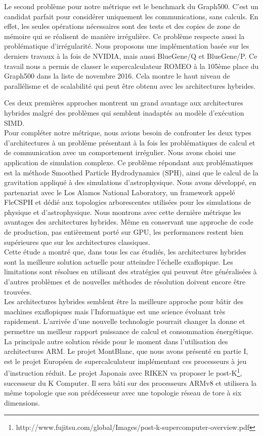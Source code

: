 \documentclass[12pt,a4paper]{report}
\begin{document}
Le second problème pour notre métrique est le benchmark du Graph500. 
C'est un candidat parfait pour considérer uniquement les communications, sans calculs. 
En effet, les seules opérations nécessaires sont des tests et des copies de zone de mémoire qui se réalisent de manière irrégulière. 
Ce problème respecte aussi la problématique d'irrégularité. 
Nous proposons une implémentation basée sur les derniers travaux à la fois de NVIDIA, mais aussi BlueGene/Q et BlueGene/P. 
Ce travail nous a permis de classer le supercalculateur ROMEO à la 105ème place du Graph500 dans la liste de novembre 2016. 
Cela montre le haut niveau de parallélisme et de scalabilité qui peut être obtenu avec les architectures hybrides.

Ces deux premières approches montrent un grand avantage aux architectures hybrides malgré des problèmes qui semblent inadaptés au modèle d'exécution SIMD. \\

Pour compléter notre métrique, nous avions besoin de confronter les deux types d'architectures à un problème présentant à la fois les problématiques de calcul et de communication avec un comportement irrégulier. 
Nous avons choisi une application de simulation complexe.
Ce problème répondant aux problématiques est la méthode Smoothed Particle Hydrodynamics (SPH), ainsi que le calcul de la gravitation appliqué à des simulations d'astrophysique.  
Nous avons développé, en partenariat avec le Los Alamos National Laboratory, un framework appelé FleCSPH et dédié aux topologies arborescentes utilisées pour les simulations de physique et d'astrophysique. 
Nous montrons avec cette dernière métrique les avantages des architectures hybrides. 
Même en conservant une approche de code de production, pas entièrement porté sur GPU, les performances restent bien supérieures que sur les architectures classiques. \\

Cette étude a montré que, dans tous les cas étudiés, les architectures hybrides sont la meilleure solution actuelle pour atteindre l'échelle exaflopique.  
Les limitations sont résolues en utilisant des stratégies qui peuvent être généralisées à d'autres problèmes et de nouvelles méthodes de résolution doivent encore être trouvées.\\

 Les architectures hybrides semblent être la meilleure approche pour bâtir des machines exaflopiques mais l'Informatique est une science évoluant très rapidement. 
L'arrivée d'une nouvelle technologie pourrait changer la donne et permettre un meilleur rapport puissance de calcul et consommation énergétique. 
La principale autre solution réside pour le moment dans l'utilisation des architectures ARM.
Le projet MontBlanc, que nous avons présenté en partie I, est le projet Européen de supercalculateur implémentant ces processeurs à jeu d'instruction réduit.  
Le projet Japonais avec RIKEN va proposer le post-K\footnote{http://www.fujitsu.com/global/Images/post-k-supercomputer-overview.pdf}, successeur du K Computer.
Il sera bâti sur des processeurs ARMv8 et utilisera la même topologie que son prédécesseur avec une topologie réseau de tore à six dimensions. 
\end{document}
